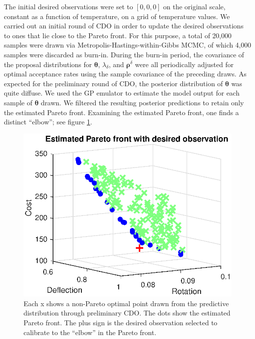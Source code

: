 \documentclass[12pt]{article}
\begin{document}
The initial desired observations were set to $[0,0,0]$ on the original scale, constant as a function of temperature, on a grid of temperature values.
%
We carried out an initial round of CDO in order to update the desired observations to ones that lie close to the Pareto front.
%
For this purpose, a total of 20,000 samples were drawn via Metropolis-Hastings-within-Gibbs MCMC, of which 4,000 samples were discarded as burn-in. 
%
During the burn-in period, the covariance of the proposal distributions for $\boldsymbol \theta$, $\lambda_\delta$, and $\boldsymbol\rho^\delta$ were all periodically adjusted for optimal acceptance rates using the sample covariance of the preceding draws.
%
%
%
As expected for the preliminary round of CDO, the posterior distribution of $\boldsymbol\theta$ was quite diffuse.
%
We used the GP emulator to estimate the model output for each sample of $\boldsymbol \theta$ drawn.
%
We filtered the resulting posterior predictions to retain only the estimated Pareto front.
%
Examining the estimated Pareto front, one finds a distinct ``elbow''; see figure \ref{fig:elbow}.
%
\begin{figure}
\centering
\includegraphics[scale=0.8]{FIG_est_PF_with_des_obs.eps}
\caption{Each x shows a non-Pareto optimal point drawn from the predictive distribution through preliminary CDO. The dots show the estimated Pareto front. The plus sign is the desired observation selected to calibrate to the ``elbow'' in the Pareto front.}
\label{fig:elbow}
\end{figure}
\end{document}
